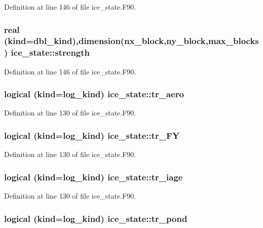 Definition at line 146 of file ice\_\-state.F90.\hypertarget{namespaceice__state_a4f093119aa04b4e413418f77e12f0cf6}{
\subsubsection[{strength}]{\setlength{\rightskip}{0pt plus 5cm}real (kind=dbl\_\-kind),dimension(nx\_\-block,ny\_\-block,max\_\-blocks) {\bf ice\_\-state::strength}}}
\label{namespaceice__state_a4f093119aa04b4e413418f77e12f0cf6}


Definition at line 146 of file ice\_\-state.F90.\hypertarget{namespaceice__state_a9a5f93f07c79fa1b586dbd336420fbfa}{
\subsubsection[{tr\_\-aero}]{\setlength{\rightskip}{0pt plus 5cm}logical (kind=log\_\-kind) {\bf ice\_\-state::tr\_\-aero}}}
\label{namespaceice__state_a9a5f93f07c79fa1b586dbd336420fbfa}


Definition at line 130 of file ice\_\-state.F90.\hypertarget{namespaceice__state_a086ac953805c6da5789990b53cb6b662}{
\subsubsection[{tr\_\-FY}]{\setlength{\rightskip}{0pt plus 5cm}logical (kind=log\_\-kind) {\bf ice\_\-state::tr\_\-FY}}}
\label{namespaceice__state_a086ac953805c6da5789990b53cb6b662}


Definition at line 130 of file ice\_\-state.F90.\hypertarget{namespaceice__state_adad96297f8eb0305b0e5ed4db6e6fbd3}{
\subsubsection[{tr\_\-iage}]{\setlength{\rightskip}{0pt plus 5cm}logical (kind=log\_\-kind) {\bf ice\_\-state::tr\_\-iage}}}
\label{namespaceice__state_adad96297f8eb0305b0e5ed4db6e6fbd3}


Definition at line 130 of file ice\_\-state.F90.\hypertarget{namespaceice__state_a56887007a4f4de6dd85325f308b9be48}{
\subsubsection[{tr\_\-pond}]{\setlength{\rightskip}{0pt plus 5cm}logical (kind=log\_\-kind) {\bf ice\_\-state::tr\_\-pond}}}
\label{namespaceice__state_a56887007a4f4de6dd85325f308b9be48}


